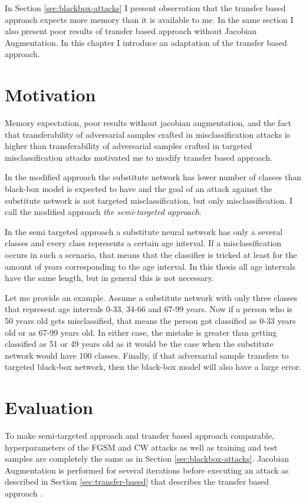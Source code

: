In Section \ref{sec:blackbox-attacks} I present observation that the transfer based approach expects more memory than it is available to me. In the same section I also present poor results of transfer based approach without Jacobian Augmentation. In this chapter I introduce an adaptation of the transfer based approach.

\section{Motivation}

Memory expectation, poor results without jacobian augmentation, and the fact that transferability of adversarial samples crafted in misclassification attacks is higher than transferability of adversarial samples crafted in targeted misclassification attacks \cite{ensemble-attack} motivated me to modify transfer based approach.

In the modified approach the substitute network has lower number of classes than black-box model is expected to have and the goal of an attack against the substitute network is not targeted misclassification, but only misclassification. I call the modified approach \textit{the semi-targeted approach}.

In the semi targeted approach a substitute neural network has only a several classes and every class represents a certain age interval. If a misclassification occurs in such a scenario, that means that the classifier is tricked at least for the amount of years corresponding to the age interval. In this thesis all age intervals have the same length, but in general this is not necessary.

Let me provide an example. Assume a substitute network with only three classes that represent age intervals 0-33, 34-66 and 67-99 years. Now if a person who is 50 years old gets misclassified, that means the person got classified as 0-33 years old or as 67-99 years old. In either case, the mistake is greater than getting classified as 51 or 49 years old as it would be the case when the substitute network would have 100 classes. Finally, if that adversarial sample transfers to targeted black-box network, then the black-box model will also have a large error.

\section{Evaluation}
To make semi-targeted approach and transfer based approach comparable, hyperparameters of the FGSM and CW attacks as well as training and test samples are completely the same as in Section \ref{sec:blackbox-attacks}. Jacobian Augmentation is performed for several iterations before executing an attack as described in Section \ref{sec:transfer-based} that describes the transfer based approach .

